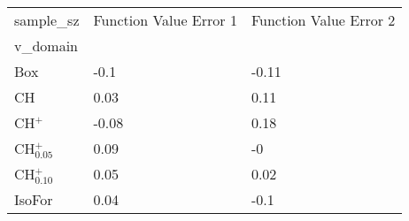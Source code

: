 \begin{tabular}{lll}
\toprule
sample_sz & Function Value Error 1 & Function Value Error 2 \\
v_domain &  &  \\
\midrule
Box & -0.1 & -0.11 \\
CH & 0.03 & 0.11 \\
CH$^+$ & -0.08 & 0.18 \\
CH$^+_{0.05}$ & 0.09 & -0 \\
CH$^+_{0.10}$ & 0.05 & 0.02 \\
IsoFor & 0.04 & -0.1 \\
\bottomrule
\end{tabular}
